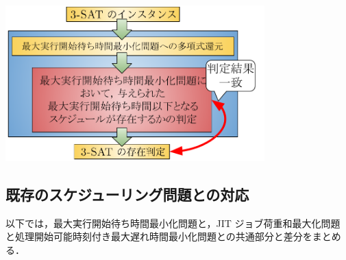 \documentclass[12pt]{optlab-bachelor}
\begin{document}
\begin{center}
  \includegraphics[width = 10cm]{figure/reduction.pdf}
\end{center}

\subsection{既存のスケジューリング問題との対応}
以下では，最大実行開始待ち時間最小化問題と，JIT ジョブ荷重和最大化問題
と処理開始可能時刻付き最大遅れ時間最小化問題との共通部分と差分をまとめる．
\end{document}
